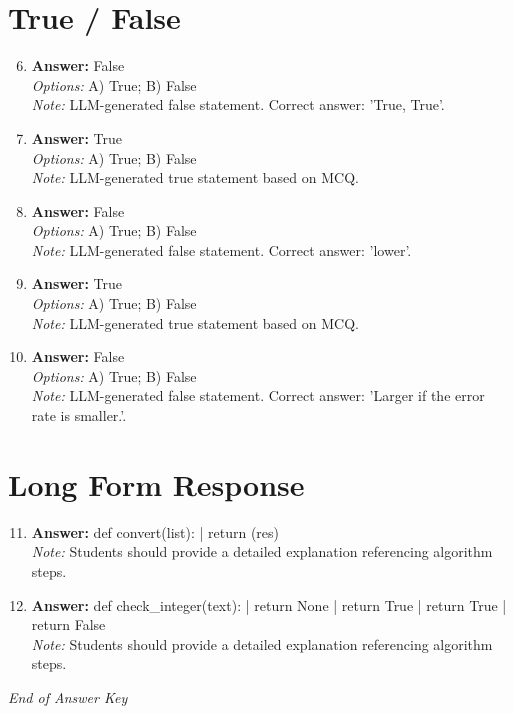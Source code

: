 \documentclass[12pt]{article}
\begin{document}
\section*{True / False}
\begin{enumerate}[label=\arabic*.]
\setcounter{enumi}{5}
\item \textbf{Answer:} False
\\ \textit{Options:} A) True; B) False
\\ \textit{Note:} LLM-generated false statement. Correct answer: 'True, True'.
\item \textbf{Answer:} True
\\ \textit{Options:} A) True; B) False
\\ \textit{Note:} LLM-generated true statement based on MCQ.
\item \textbf{Answer:} False
\\ \textit{Options:} A) True; B) False
\\ \textit{Note:} LLM-generated false statement. Correct answer: 'lower'.
\item \textbf{Answer:} True
\\ \textit{Options:} A) True; B) False
\\ \textit{Note:} LLM-generated true statement based on MCQ.
\item \textbf{Answer:} False
\\ \textit{Options:} A) True; B) False
\\ \textit{Note:} LLM-generated false statement. Correct answer: 'Larger if the error rate is smaller.'.
\end{enumerate}

\section*{Long Form Response}
\begin{enumerate}[label=\arabic*.]
\setcounter{enumi}{10}
\item \textbf{Answer:} def convert(list): | return (res)
\\ \textit{Note:} Students should provide a detailed explanation referencing algorithm steps.
\item \textbf{Answer:} def check\_integer(text): | return None | return True | return True | return False
\\ \textit{Note:} Students should provide a detailed explanation referencing algorithm steps.
\end{enumerate}

\vfill
\noindent\textit{End of Answer Key}
\end{document}

